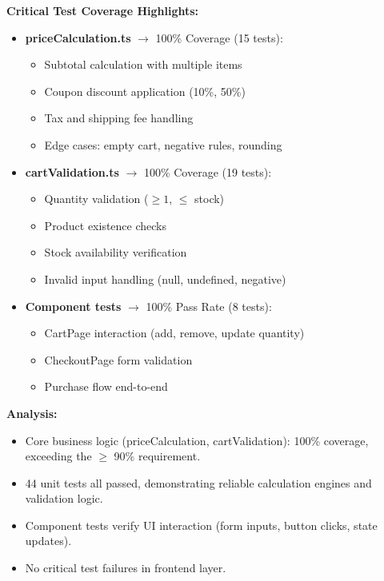 \documentclass[11pt,a4paper]{article}
\begin{document}
\textbf{Critical Test Coverage Highlights:}
\begin{itemize}
    \item \checkmark \textbf{priceCalculation.ts} $\rightarrow$ 100\% Coverage (15 tests):
    \begin{itemize}
        \item Subtotal calculation with multiple items
        \item Coupon discount application (10\%, 50\%)
        \item Tax and shipping fee handling
        \item Edge cases: empty cart, negative rules, rounding
    \end{itemize}

    \item \checkmark \textbf{cartValidation.ts} $\rightarrow$ 100\% Coverage (19 tests):
    \begin{itemize}
        \item Quantity validation ($\geq 1$, $\leq$ stock)
        \item Product existence checks
        \item Stock availability verification
        \item Invalid input handling (null, undefined, negative)
    \end{itemize}

    \item \checkmark \textbf{Component tests} $\rightarrow$ 100\% Pass Rate (8 tests):
    \begin{itemize}
        \item CartPage interaction (add, remove, update quantity)
        \item CheckoutPage form validation
        \item Purchase flow end-to-end
    \end{itemize}
\end{itemize}

\textbf{Analysis:}
\begin{itemize}
    \item Core business logic (priceCalculation, cartValidation): 100\% coverage, exceeding the $\geq$ 90\% requirement.
    \item 44 unit tests all passed, demonstrating reliable calculation engines and validation logic.
    \item Component tests verify UI interaction (form inputs, button clicks, state updates).
    \item No critical test failures in frontend layer.
\end{itemize}
\end{document}
